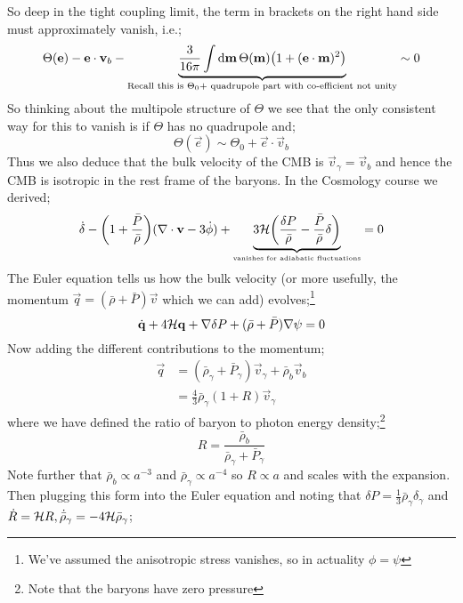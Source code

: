 So deep in the tight coupling limit, the term in brackets on the right hand side must approximately vanish, i.e.;
\begin{equation*}
\Theta(\vec{e}) - \vec{e}\cdot\vec{v}_b - \underbrace{\frac{3}{16\pi}\int{\upd{\vec{m}}\Theta(\vec{m})\left(1 + (\vec{e}\cdot\vec{m})^2\right)}}_{\text{Recall this is } \Theta_0 + \text{ quadrupole part with co-efficient not unity}} \sim 0
\end{equation*}
So thinking about the multipole structure of $\Theta$ we see that the only consistent way for this to vanish is if $\Theta$ has no quadrupole and;
\begin{equation*}
\Theta(\vec{e}) \sim \Theta_0 + \vec{e}\cdot\vec{v}_b
\end{equation*}
Thus we also deduce that the bulk velocity of the CMB is $\vec{v}_\gamma = \vec{v}_b$ and hence the CMB is isotropic in the rest frame of the baryons. In the Cosmology course we derived;
\begin{equation}
\dot{\delta} - \left(1 + \frac{\bar{P}}{\bar{\rho}}\right)(\nabla \cdot \vec{v} - 3\dot{\phi}) + \underbrace{3\hamilt\left(\frac{\delta P}{\bar{\rho}} - \frac{\bar{P}}{\bar{\rho}}\delta\right)}_{\text{\tiny vanishes for adiabatic fluctuations}} = 0
\end{equation}
The Euler equation tells us how the bulk velocity (or more usefully, the momentum $\vec{q} = (\bar{\rho} + \bar{P})\vec{v}$ which we can add) evolves;\footnote{We've assumed the anisotropic stress vanishes, so in actuality $\phi = \psi$}
\begin{equation}
\dot{\mathbf{q}} + 4\mathcal{H}\mathbf{q} + \nabla \delta P + (\bar{\rho} + \bar{P})\nabla \psi = 0
\end{equation}
Now adding the different contributions to the momentum;
\begin{align*}
\vec{q} &= \left(\bar{\rho}_\gamma + \bar{P}_{\gamma}\right)\vec{v}_{\gamma} + \bar{\rho}_b \vec{v}_b \\
&= \frac{4}{3}\bar{\rho}_\gamma \left(1 + R\right) \vec{v}_{\gamma}
\end{align*}
where we have defined the ratio of baryon to photon energy density;\footnote{Note that the baryons have zero pressure}
\begin{equation}
R = \frac{\bar{\rho}_b}{\bar{\rho}_\gamma + \bar{P}_\gamma}
\end{equation}
Note further that $\bar{\rho}_b \propto a^{-3}$ and $\bar{\rho}_\gamma \propto a^{-4}$ so $R \propto a$ and scales with the expansion. Then plugging this form into the Euler equation and noting that $\delta P = \tfrac{1}{3}\bar{\rho}_\gamma \delta_\gamma$ and $\dot{R} = \mathcal{H} R, \dot{\bar{\rho}}_\gamma = -4\mathcal{H} \bar{\rho}_\gamma$;
